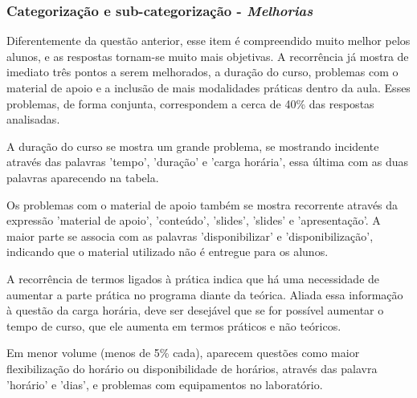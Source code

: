 \subsubsection*{Categorização e sub-categorização - \textit{Melhorias}}

Diferentemente da questão anterior, esse item é compreendido muito melhor pelos alunos, e as respostas tornam-se muito mais objetivas. A recorrência já mostra de imediato três pontos a serem melhorados, a duração do curso, problemas com o material de apoio e a inclusão de mais modalidades práticas dentro da aula. Esses problemas, de forma conjunta, correspondem a cerca de 40\% das respostas analisadas.

A duração do curso se mostra um grande problema, se mostrando incidente através das palavras 'tempo', 'duração' e 'carga horária', essa última com as duas palavras aparecendo na tabela.

Os problemas com o material de apoio também se mostra recorrente através da expressão 'material de apoio', 'conteúdo', 'slides', 'slides' e 'apresentação'. A maior parte se associa com as palavras 'disponibilizar' e 'disponibilização', indicando que o material utilizado não é entregue para os alunos.

A recorrência de termos ligados à prática indica que há uma necessidade de aumentar a parte prática no programa diante da teórica. Aliada essa informação à questão da carga horária, deve ser desejável que se for possível aumentar o tempo de curso, que ele aumenta em termos práticos e não teóricos.

Em menor volume (menos de 5\% cada), aparecem questões como maior flexibilização do horário ou disponibilidade de horários, através das palavra 'horário' e 'dias', e problemas com equipamentos no laboratório.

